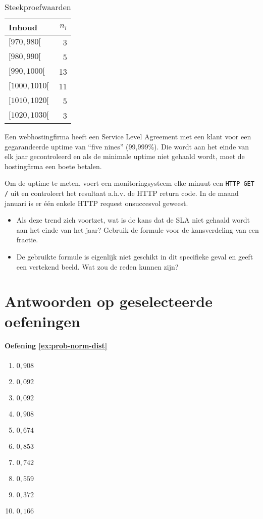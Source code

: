   \begin{table}
  \centering
  \begin{tabular}{lr}
    \toprule
    Inhoud & $n_{i}$ \\
    \midrule
    $[970,980[$ & 3 \\
    $[980,990[$ & 5 \\
    $[990,1000[$ & 13 \\
    $[1000,1010[$ & 11 \\
    $[1010,1020[$ & 5 \\
    $[1020,1030[$ & 3 \\
    \bottomrule
  \end{tabular}
  \caption{Steekproefwaarden}
  \label{tab:Steekproefwaarden}
\end{table}

\begin{exercise}
  Een webhostingfirma heeft een Service Level Agreement met een klant voor een gegarandeerde uptime van ``five nines'' (99,999\%).  Die wordt aan het einde van elk jaar gecontroleerd en als de minimale uptime niet gehaald wordt, moet de hostingfirma een boete betalen.

  Om de uptime te meten, voert een monitoringsysteem elke minuut een \texttt{HTTP GET /} uit en controleert het resultaat a.h.v.
  de HTTP return code. In de maand januari is er één enkele HTTP request onsuccesvol geweest.

  \begin{itemize}
    \item Als deze trend zich voortzet, wat is de kans dat de SLA niet gehaald wordt aan het einde van het jaar? Gebruik de formule voor de kansverdeling van een fractie.
    \item De gebruikte formule is eigenlijk niet geschikt in dit specifieke geval en geeft een vertekend beeld. Wat zou de reden kunnen zijn?
  \end{itemize}
\end{exercise}

\section{Antwoorden op geselecteerde oefeningen}
\label{sec:oplossingen-steekproefonderzoek}

\paragraph{Oefening \ref{ex:prob-norm-dist}}

\begin{enumerate}[label=\alph*.]
  \item $0,908$
  \item $0,092$
  \item $0,092$
  \item $0,908$
  \item $0,674$
  \item $0,853$
  \item $0,742$
  \item $0,559$
  \item $0,372$
  \item $0,166$
\end{enumerate}

   